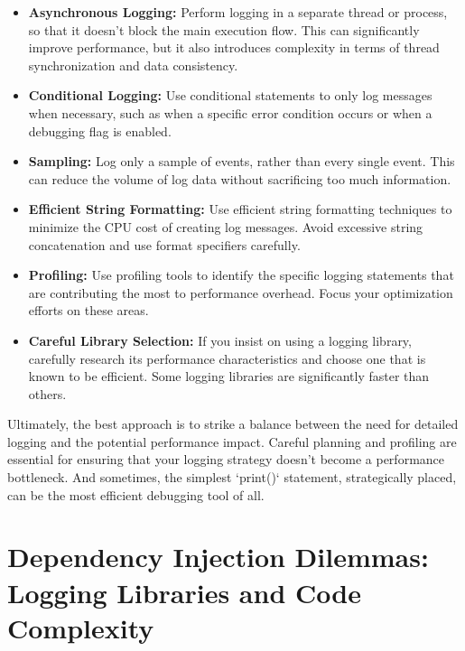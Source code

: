 \documentclass{article}
\begin{document}
{{{{\begin{itemize}
    \item \textbf{Asynchronous Logging:} Perform logging in a separate thread or process, so that it doesn't block the main execution flow. This can significantly improve performance, but it also introduces complexity in terms of thread synchronization and data consistency.
    \item \textbf{Conditional Logging:} Use conditional statements to only log messages when necessary, such as when a specific error condition occurs or when a debugging flag is enabled.
    \item \textbf{Sampling:} Log only a sample of events, rather than every single event. This can reduce the volume of log data without sacrificing too much information.
    \item \textbf{Efficient String Formatting:} Use efficient string formatting techniques to minimize the CPU cost of creating log messages. Avoid excessive string concatenation and use format specifiers carefully.
    \item \textbf{Profiling:} Use profiling tools to identify the specific logging statements that are contributing the most to performance overhead. Focus your optimization efforts on these areas.
    \item \textbf{Careful Library Selection:} If you insist on using a logging library, carefully research its performance characteristics and choose one that is known to be efficient. Some logging libraries are significantly faster than others.
\end{itemize}

Ultimately, the best approach is to strike a balance between the need for detailed logging and the potential performance impact. Careful planning and profiling are essential for ensuring that your logging strategy doesn't become a performance bottleneck. And sometimes, the simplest `print()` statement, strategically placed, can be the most efficient debugging tool of all.

\newpage

\section*{Dependency Injection Dilemmas: Logging Libraries and Code Complexity} %
\label{chapter-7-4-Dependency_Injection_Dilemmas__Logging_L}

}}}}
\end{document}
